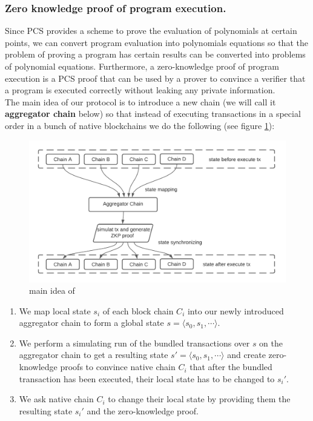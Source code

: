 \documentclass[pageno]{jpaper}
\begin{document}
\subsubsection{Zero knowledge proof of program execution.}
Since PCS provides a scheme to prove the evaluation of polynomials at certain points, we can convert program evaluation into polynomials equations so that the problem of proving a program has certain results can be converted into problems of polynomial equations. Furthermore, a zero-knowledge proof of program execution is a PCS proof that can be used by a prover to convince a verifier that a program is executed correctly without leaking any private information.\\
\newline
The main idea of our protocol is to introduce a new chain (we will call it {\bf aggregator chain} below) so that instead of executing transactions in a special order in a bunch of native blockchains we do the following (see figure \ref{main-idea}):

\begin{figure}[!ht]
\caption{main idea of \dprotocol}
\label{main-idea}
\includegraphics[scale=0.4]{main-idea}
\end{figure}
\begin{enumerate}[leftmargin=*]
\item We map local state $s_i$ of each block chain $C_i$ into our newly introduced aggregator chain to form a global state $s = \langle s_0, s_1, \cdots \rangle$.
\item We perform a simulating run of the bundled transactions over $s$ on the aggregator chain to get a resulting state $s' = \langle s_0, s_1, \cdots \rangle$ and create zero-knowledge proofs to convince native chain $C_i$ that after the bundled transaction has been executed, their local state has to be changed to $s_i'$.
\item We ask native chain $C_i$ to change their local state by providing them the resulting state $s_i'$ and the zero-knowledge proof.
\end{enumerate}
\end{document}
